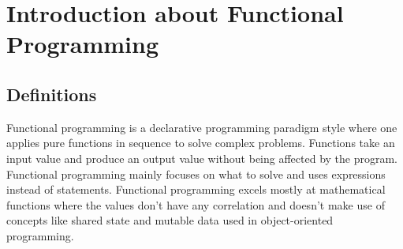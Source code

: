 \documentclass[12pt]{article}
\begin{document}

\newpage
\tableofcontents
\newpage


\section{Introduction about Functional Programming}
\subsection{Definitions}
Functional programming is a declarative programming paradigm style where one applies pure functions in sequence to solve complex problems. Functions take an input value and produce an output value without being affected by the program. Functional programming mainly focuses on what to solve and uses expressions instead of statements. Functional programming excels mostly at mathematical functions where the values don’t have any correlation and doesn’t make use of concepts like shared state and mutable data used in object-oriented programming.
\end{document}
